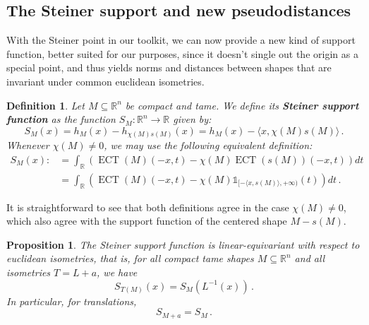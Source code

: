 \documentclass[a4paper]{article}
\newtheorem{prop}[theorem]{Proposition}
\newtheorem{definition}[theorem]{Definition}
\newcommand{\ECT}{\operatorname{ECT}}
\newcommand{\bb}{\mathbb}
\newcommand{\la}{\langle}
\newcommand{\ra}{\rangle}
\begin{document}
\subsection{The Steiner support and new pseudodistances}

With the Steiner point in our toolkit, we can now provide a new kind of support function, better suited for our purposes, since it doesn't single out the origin as a special point, and thus yields norms and distances between shapes that are invariant under common euclidean isometries.

\begin{definition}
	Let $M\subseteq \bb R^n$ be compact and tame. We define its \textbf{Steiner support function} as the function $S_M: \bb  R^n\to \bb R$ given by:
	\[ S_M(x) = h_M(x)-h_{\chi(M)s(M)}(x) =h_M(x)- \la x, \chi(M)s(M) \ra\, .\]
	Whenever $\chi(M) \neq 0$, we may use the following equivalent definition:
	\begin{align*} S_M(x):&=\int_{\bb R} (\ECT(M)(-x,t)-\chi(M) \ECT(s(M))(-x,t)) dt \\
		&=\int_{\bb R} (\ECT(M)(-x,t)-\chi(M) \bb 1_{[-\langle x,s(M) \rangle, +\infty)}(t)) dt\, .
	\end{align*}
\end{definition}

	It is straightforward to see that both definitions agree in the case $\chi(M) \neq 0$, which also agree with the support function of the centered shape $M-s(M)$. 

\begin{prop}
	\label{LinEquiv}
	The Steiner support function is linear-equivariant with respect to euclidean isometries, that is, for all compact tame shapes $M\subseteq \bb R^n$ and all isometries $T=L+a$, we have
	\[ S_{T(M)}(x)=S_{M}(L^{-1}(x))\, .\]
	In particular, for translations,
	\[ S_{M+a}=S_M\, .\]
\end{prop}
\end{document}
